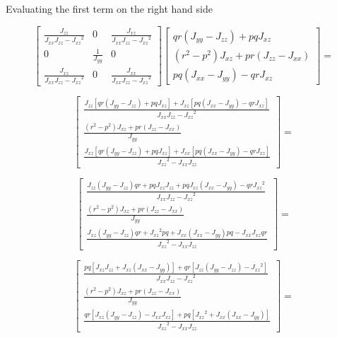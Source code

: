 Evaluating the first term on the right hand side

\begin{equation*}
  \begin{bmatrix}
    \frac{J_{zz}}{J_{xx}J_{zz}-{J_{xz}}^{2}} & 0 & \frac{J_{xz}}{J_{xx}J_{zz}-{J_{xz}}^{2}} \\
    0 & \frac{1}{J_{yy}} & 0 \\
    \frac{J_{xz}}{J_{xx}J_{zz}-{J_{xz}}^{2}} & 0 & \frac{J_{xx}}{J_{xx}J_{zz}-{J_{xz}}^{2}}
  \end{bmatrix}
  \begin{bmatrix}
    qr(J_{yy}-J_{zz})+pqJ_{xz} \\
    (r^{2}-p^{2})J_{xz}+pr(J_{zz}-J_{xx}) \\
    pq(J_{xx}-J_{yy})-qrJ_{xz}
  \end{bmatrix}=
\end{equation*}

\begin{equation*}
  \begin{bmatrix}
    \frac{J_{zz}[qr(J_{yy}-J_{zz})+pqJ_{xz}]+J_{xz}[pq(J_{xx}-J_{yy})-qrJ_{xz}]}{J_{xx}J_{zz}-{J_{xz}}^{2}} \\
    \frac{(r^{2}-p^{2})J_{xz}+pr(J_{zz}-J_{xx})}{J_{yy}} \\
    \frac{J_{xz}[qr(J_{yy}-J_{zz})+pqJ_{xz}]+J_{xx}[pq(J_{xx}-J_{yy})-qrJ_{xz}]}{{J_{xz}}^{2}-J_{xx}J_{zz}}
  \end{bmatrix}=
\end{equation*}

\begin{equation*}
  \begin{bmatrix}
    \frac{J_{zz}(J_{yy}-J_{zz})qr+pqJ_{xz}J_{zz}+pqJ_{xz}(J_{xx}-J_{yy})-qr{J_{xz}}^{2}}{J_{xx}J_{zz}-{J_{xz}}^{2}} \\
    \frac{(r^{2}-p^{2})J_{xz}+pr(J_{zz}-J_{xx})}{J_{yy}} \\
    \frac{J_{xz}(J_{yy}-J_{zz})qr+{J_{xz}}^{2}pq+J_{xx}(J_{xx}-J_{yy})pq-J_{xx}J_{xz}qr}{{J_{xz}}^{2}-J_{xx}J_{zz}}
  \end{bmatrix}=
\end{equation*}

\begin{equation*}
  \begin{bmatrix}
    \frac{pq[J_{xz}J_{zz}+J_{xz}(J_{xx}-J_{yy})]+qr[J_{zz}(J_{yy}-J_{zz})-{J_{xz}}^{2}]}{J_{xx}J_{zz}-{J_{xz}}^{2}} \\
    \frac{(r^{2}-p^{2})J_{xz}+pr(J_{zz}-J_{xx})}{J_{yy}} \\
    \frac{qr[J_{xz}(J_{yy}-J_{zz})-J_{xx}J_{xz}]+pq[{J_{xz}}^{2}+J_{xx}(J_{xx}-J_{yy})]}{{J_{xz}}^{2}-J_{xx}J_{zz}}
  \end{bmatrix}=
\end{equation*}

